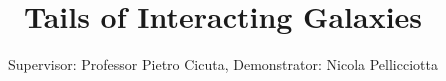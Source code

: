 \documentclass[11pt,a4paper]{article}
\author{Supervisor: Professor Pietro Cicuta, Demonstrator: Nicola Pellicciotta}
\title{Tails of Interacting Galaxies}
\begin{document}
\maketitle
\vspace{2 cm}
\begin{abstract}
\end{abstract}
\end{document}
